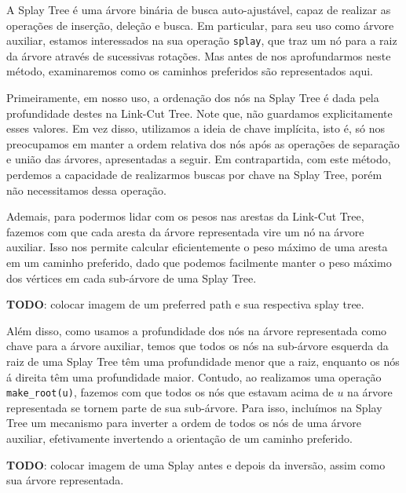A Splay Tree é uma árvore binária de busca auto-ajustável, capaz de realizar as operações de inserção, deleção e busca. Em particular, para seu uso como árvore auxiliar, estamos interessados na sua operação \texttt{splay}, que traz um nó para a raiz da árvore através de sucessivas rotações. Mas antes de nos aprofundarmos neste método, examinaremos como os caminhos preferidos são representados aqui.

Primeiramente, em nosso uso, a ordenação dos nós na Splay Tree é dada pela profundidade destes na Link-Cut Tree. Note que, não guardamos explicitamente esses valores. Em vez disso, utilizamos a ideia de chave implícita, isto é, só nos preocupamos em manter a ordem relativa dos nós após as operações de separação e união das árvores, apresentadas a seguir. Em contrapartida, com este método, perdemos a capacidade de realizarmos buscas por chave na Splay Tree, porém não necessitamos dessa operação.

Ademais, para podermos lidar com os pesos nas arestas da Link-Cut Tree, fazemos com que cada aresta da árvore representada vire um nó na árvore auxiliar. Isso nos permite calcular eficientemente o peso máximo de uma aresta em um caminho preferido, dado que podemos facilmente manter o peso máximo dos vértices em cada sub-árvore de uma Splay Tree.

\begin{center}
    \textbf{TODO}: colocar imagem de um preferred path e sua respectiva splay tree.
\end{center}

Além disso, como usamos a profundidade dos nós na árvore representada como chave para a árvore auxiliar, temos que todos os nós na sub-árvore esquerda da raiz de uma Splay Tree têm uma profundidade menor que a raiz, enquanto os nós á direita têm uma profundidade maior. Contudo, ao realizamos uma operação \texttt{make\_root(u)}, fazemos com que todos os nós que estavam acima de $u$ na árvore representada se tornem parte de sua sub-árvore. Para isso, incluímos na Splay Tree um mecanismo para inverter a ordem de todos os nós de uma árvore auxiliar, efetivamente invertendo a orientação de um caminho preferido.

\begin{center}
    \textbf{TODO}: colocar imagem de uma Splay antes e depois da inversão, assim como sua árvore representada.
\end{center}

